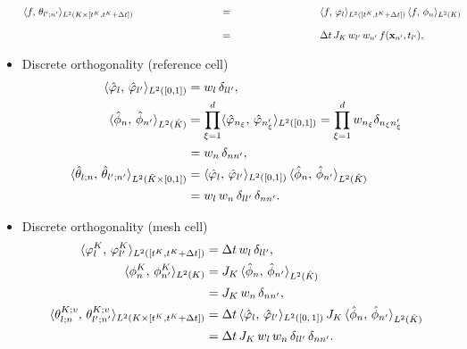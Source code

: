 \documentclass{scrreprt}
\theoremstyle{definition}
\theoremstyle{nonumberplain}
\renewcommand{\vec}[1]{{\textbf{#1}}}
\newcommand{\cell}{K}
\newcommand{\refCell}{\hat{\cell}}
\newcommand{\detJ}{J_\cell}
\begin{document}
\begin{itemize}
\begin{align}
\\
\langle f,\,\theta_{l';n'}\rangle
_{L^2(\cell\times[t^\cell,t^\cell+\Delta t])}
&
\overset{\phantom{\eqref{eq:ader_impl:mappings:volume_integral}}}{=}
\langle f,\,\varphi_{l}\rangle_{L^2([t^\cell,t^\cell+\Delta t])}\,
\langle f,\,\phi_{n}\rangle_{L^2(\cell)}
\notag
\\
&
\overset{\phantom{\eqref{eq:ader_impl:mappings:volume_integral}}}{=}
\Delta t\,\detJ\,
w_{l'}\,w_{n'}\,
f(\vec{x}_{n'},t_{l'}),
\end{align}
\item Discrete orthogonality (reference cell)
\begin{align}
\label{eq:ader_impl:basis:discrete_ortho_ref_1d}
\langle \hat{\varphi}_{l},\,\hat{\varphi}_{l'}\rangle_{L^2([0,1])}   &=
w_l\,\delta_{ll'},
\\
\label{eq:ader_impl:basis:discrete_ortho_ref_3d}
\langle \hat{\phi}_{n},\,\hat{\phi}_{n'}\rangle_{L^2(\refCell)}
&= \prod_{\xi=1}^d
\langle \hat{\varphi}_{n_\xi},\,\hat{\varphi}_{n'_\xi}\rangle_{L^2([0,1])}
=
\prod_{\xi=1}^{d}
w_{n_\xi}
\delta_{n_\xi n'_\xi}\notag
\\
&=
w_{n}
\,\delta_{n n'}
,
\\
\langle\hat{\theta}_{l;n},\,\hat{\theta}_{l';n'}\rangle
_{L^2(\refCell\times[0,1])}
&=
\langle \hat{\varphi}_{l},\,\hat{\varphi}_{l'}\rangle_{L^2([0,1])}
\,
\langle \hat{\phi}_{n},\,\hat{\phi}_{n'}\rangle_{L^2(\refCell)}\notag
\\
&= w_{l}\,w_{n}\,
\delta_{l l'}\,\delta_{n n'}.
\end{align}
\item Discrete orthogonality (mesh cell)
\begin{align}
\langle \varphi^\cell_{l},\,\varphi^\cell_{l'}\rangle_{L^2([t^K,t^K+\Delta
t])} &= \Delta t\,w_l\,\delta_{ll'},
\\
\label{eq:ader_impl:basis:discrete_ortho_mesh_3d}
\langle \phi^\cell_{n},\,\phi^\cell_{n'}\rangle_{L^2(\cell)}
&=
\detJ\,\langle \hat{\phi}_{n},\,\hat{\phi}_{n'}\rangle_{L^2(\refCell)}\notag
\\
&=
\detJ\,
w_{n}\,
\delta_{n n'},
\\
\langle\theta^{K;v}_{l;n},\,\theta^{K;v}_{l';n'}\rangle
_{L^2(\cell\times[t^K,t^K+\Delta t])}
&=
\Delta t\,
\langle \hat{\varphi}_{l},\,\hat{\varphi}_{l'}\rangle_{L^2([0,\,1])}
\,
\detJ\,
\langle \hat{\phi}_{n},\,\hat{\phi}_{n'}\rangle_{L^2(\refCell)}\notag
\\
&= \Delta t\,\detJ\,w_{l}\,w_{n}\,\delta_{l l'}\,\delta_{n n'}.

\end{align}
\end{itemize}
\end{document}
